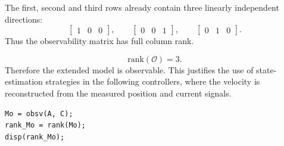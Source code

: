 The first, second and third rows already contain three linearly independent directions:
\begin{equation}
    \begin{bmatrix} 1 & 0 & 0 \end{bmatrix},
    \qquad
    \begin{bmatrix} 0 & 0 & 1 \end{bmatrix},
    \qquad
    \begin{bmatrix} 0 & 1 & 0 \end{bmatrix}.
\end{equation}
Thus the observability matrix has full column rank.

\begin{equation}
    \mathrm{rank}(\mathcal{O}) = 3.
\end{equation}
Therefore the extended model is observable. This justifies the use of state-estimation strategies in
the following controllers, where the velocity is reconstructed from the measured position and current
signals.

\begin{lstlisting}[style=matlabstyle,caption={Observability check.}]
Mo = obsv(A, C);
rank_Mo = rank(Mo);
disp(rank_Mo);
\end{lstlisting}
